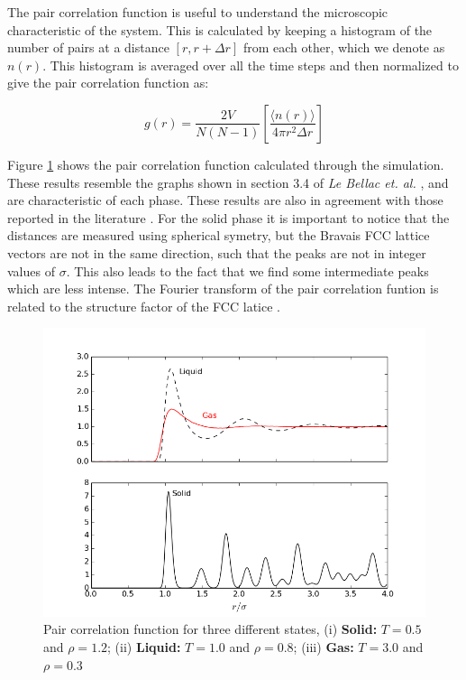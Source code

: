 \documentclass[aps,prl,reprint,groupedaddress]{revtex4-1}
\begin{document}
The pair correlation function is useful to understand the microscopic characteristic of the system. This is calculated by keeping a histogram of the number of pairs at a distance $[r, r+\Delta r]$ from each other, which we denote as $n(r)$. This histogram is averaged over all the time steps and then normalized to give the pair correlation function as:

\begin{equation}
  g(r) = \frac{2V}{N(N-1)} \left[\frac{\langle n(r) \rangle}{4 \pi r^2 \Delta r} \right]
\end{equation}

Figure \ref{correl_graph} shows the pair correlation function calculated through the simulation. These results resemble the graphs shown in section 3.4 of \textit{Le Bellac et. al.} \cite{Bellac2004}, and are characteristic of each phase. These results are also in agreement with those reported in the literature \cite{Rahman1964, Verlet1968}. For the solid phase it is important to notice that the distances are measured using spherical symetry, but the Bravais FCC lattice vectors are not in the same direction, such that the peaks are not in integer values of $\sigma$. This also leads to the fact that we find some intermediate peaks which are less intense. The Fourier transform of the pair correlation funtion is related to the structure factor of the FCC latice \cite{Bellac2004}.

\begin{figure}[ht]
	\includegraphics[scale=0.45]{correlation.png}
	\caption{Pair correlation function for three different states, (i) \textbf{Solid:} $T = 0.5$ and $\rho = 1.2$; (ii) \textbf{Liquid:} $T = 1.0$ and $\rho = 0.8$; (iii) \textbf{Gas:} $T = 3.0$ and $\rho = 0.3$ \label{correl_graph}}
\end{figure}
\end{document}

